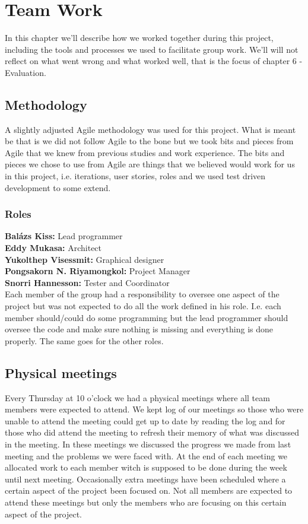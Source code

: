 \documentclass[11pt]{article}
\begin{document}
\newpage
\section{Team Work}
In this chapter we'll describe how we worked together during this project, including the tools and processes we used to facilitate group work. We'll will not reflect on what went wrong and what worked well, that is the focus of chapter 6 - Evaluation.
\subsection{Methodology}
A slightly adjusted Agile methodology was used for this project. What is meant be that is we did not follow Agile to the bone but we took bits and pieces from Agile that we knew from previous studies and work experience. The bits and pieces we chose to use from Agile are things that we believed would work for us in this project, i.e. iterations, user stories, roles and we used test driven development to some extend.
\subsubsection{Roles}
\textbf{Balázs Kiss:} Lead programmer\\
\textbf{Eddy Mukasa:} Architect \\
\textbf{Yukolthep Visessmit:} Graphical designer \\
\textbf{Pongsakorn N. Riyamongkol:} Project Manager \\
\textbf{Snorri Hannesson:} Tester and Coordinator \\ \newline
Each member of the group had a responsibility to oversee one aspect of the project but was not expected to do all the work defined in his role. I.e. each member should/could do some programming but the lead programmer should oversee the code and make sure nothing is missing and everything is done properly. The same goes for the other roles.

\subsection{Physical meetings}
Every Thursday at 10 o'clock we had a physical meetings where all team members were expected to attend. We kept log of our meetings so those who were unable to attend the meeting could get up to date by reading the log and for those who did attend the meeting to refresh their memory of what was discussed in the meeting.
In these meetings we discussed the progress we made from last meeting and the problems we were faced with. At the end of each meeting we allocated work to each member witch is supposed to be done during the week until next meeting.
Occasionally extra meetings have been scheduled where a certain aspect of the project been focused on. Not all members are expected to attend these meetings but only the members who are focusing on this certain aspect of the project.
\end{document}

